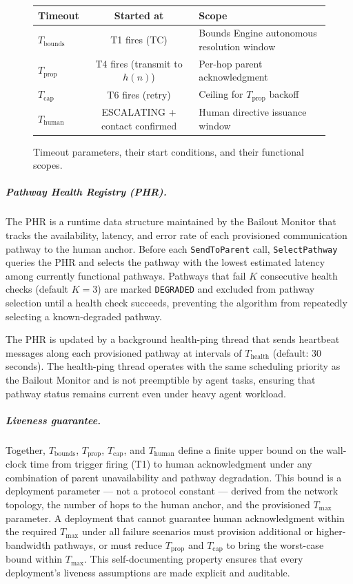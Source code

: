 \begin{figure}[htbp]
\centering
\begin{tabular}{lcl}
\hline
\textbf{Timeout} & \textbf{Started at} & \textbf{Scope} \\ \hline
$T_{\text{bounds}}$ & T1 fires (TC) & Bounds Engine autonomous resolution window \\
$T_{\text{prop}}$ & T4 fires (transmit to $h(n)$) & Per-hop parent acknowledgment \\
$T_{\text{cap}}$ & T6 fires (retry) & Ceiling for $T_{\text{prop}}$ backoff \\
$T_{\text{human}}$ & ESCALATING + contact confirmed & Human directive issuance window \\
\hline
\end{tabular}
\caption{Timeout parameters, their start conditions, and their functional scopes.}
\label{tab:timeouts}
\end{figure}

\subparagraph{Pathway Health Registry (PHR).} The PHR is a runtime data structure maintained by the Bailout Monitor that tracks the availability, latency, and error rate of each provisioned communication pathway to the human anchor. Before each \texttt{SendToParent} call, \texttt{SelectPathway} queries the PHR and selects the pathway with the lowest estimated latency among currently functional pathways. Pathways that fail $K$ consecutive health checks (default $K = 3$) are marked \texttt{DEGRADED} and excluded from pathway selection until a health check succeeds, preventing the algorithm from repeatedly selecting a known-degraded pathway.

The PHR is updated by a background health-ping thread that sends heartbeat messages along each provisioned pathway at intervals of $T_{\text{health}}$ (default: 30 seconds). The health-ping thread operates with the same scheduling priority as the Bailout Monitor and is not preemptible by agent tasks, ensuring that pathway status remains current even under heavy agent workload.

\subparagraph{Liveness guarantee.} Together, $T_{\text{bounds}}$, $T_{\text{prop}}$, $T_{\text{cap}}$, and $T_{\text{human}}$ define a finite upper bound on the wall-clock time from trigger firing (T1) to human acknowledgment under any combination of parent unavailability and pathway degradation. This bound is a deployment parameter — not a protocol constant — derived from the network topology, the number of hops to the human anchor, and the provisioned $T_{\max}$ parameter. A deployment that cannot guarantee human acknowledgment within the required $T_{\max}$ under all failure scenarios must provision additional or higher-bandwidth pathways, or must reduce $T_{\text{prop}}$ and $T_{\text{cap}}$ to bring the worst-case bound within $T_{\max}$. This self-documenting property ensures that every deployment's liveness assumptions are made explicit and auditable.
